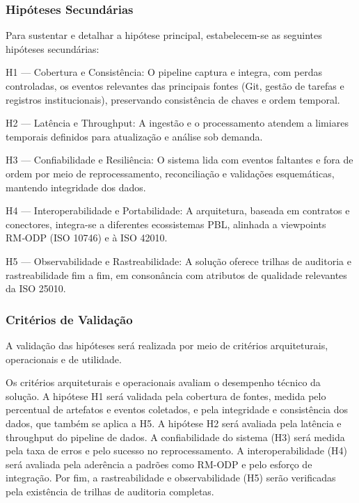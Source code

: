 \documentclass[12pt,a4paper]{article}
\begin{document}
\subsubsection{Hipóteses Secundárias}

Para sustentar e detalhar a hipótese principal, estabelecem-se as seguintes 
hipóteses secundárias:

H1 — Cobertura e Consistência: O pipeline captura e integra, com perdas 
controladas, os eventos relevantes das principais fontes (Git, gestão de 
tarefas e registros institucionais), preservando consistência de chaves e 
ordem temporal.

H2 — Latência e Throughput: A ingestão e o processamento atendem a 
limiares temporais definidos para atualização e análise sob demanda.

H3 — Confiabilidade e Resiliência: O sistema lida com eventos 
faltantes e fora de ordem por meio de reprocessamento, reconciliação e 
validações esquemáticas, mantendo integridade dos dados.

H4 — Interoperabilidade e Portabilidade: A arquitetura, baseada em 
contratos e conectores, integra-se a diferentes ecossistemas PBL, alinhada a 
viewpoints RM‑ODP (ISO 10746) e à ISO 42010.

H5 — Observabilidade e Rastreabilidade: A solução oferece trilhas de 
auditoria e rastreabilidade fim a fim, em consonância com atributos de 
qualidade relevantes da ISO 25010.

\subsubsection{Critérios de Validação}

A validação das hipóteses será realizada por meio de critérios arquiteturais, operacionais e de utilidade.

Os critérios arquiteturais e operacionais avaliam o desempenho técnico da solução. A hipótese H1 será validada pela cobertura de fontes, medida pelo percentual de artefatos e eventos coletados, e pela integridade e consistência dos dados, que também se aplica a H5. A hipótese H2 será avaliada pela latência e throughput do pipeline de dados. A confiabilidade do sistema (H3) será medida pela taxa de erros e pelo sucesso no reprocessamento. A interoperabilidade (H4) será avaliada pela aderência a padrões como RM-ODP e pelo esforço de integração. Por fim, a rastreabilidade e observabilidade (H5) serão verificadas pela existência de trilhas de auditoria completas.
\end{document}
